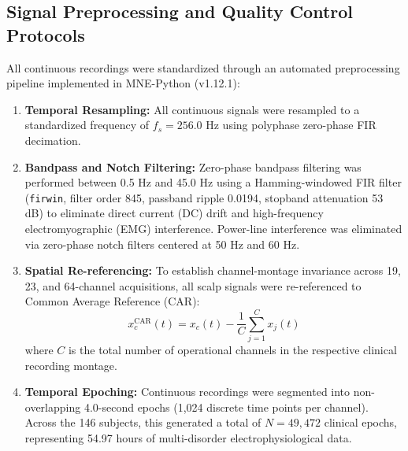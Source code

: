 \documentclass[11pt,a4paper]{article}
\begin{document}
\subsection{Signal Preprocessing and Quality Control Protocols}
All continuous recordings were standardized through an automated preprocessing pipeline implemented in MNE-Python (v1.12.1):
\begin{enumerate}
    \item \textbf{Temporal Resampling:} All continuous signals were resampled to a standardized frequency of $f_s = 256.0\text{ Hz}$ using polyphase zero-phase FIR decimation.
    \item \textbf{Bandpass and Notch Filtering:} Zero-phase bandpass filtering was performed between 0.5 Hz and 45.0 Hz using a Hamming-windowed FIR filter (\texttt{firwin}, filter order 845, passband ripple 0.0194, stopband attenuation 53 dB) to eliminate direct current (DC) drift and high-frequency electromyographic (EMG) interference. Power-line interference was eliminated via zero-phase notch filters centered at 50 Hz and 60 Hz.
    \item \textbf{Spatial Re-referencing:} To establish channel-montage invariance across 19, 23, and 64-channel acquisitions, all scalp signals were re-referenced to Common Average Reference (CAR):
    \begin{equation}
        x_c^{\text{CAR}}(t) = x_c(t) - \frac{1}{C} \sum_{j=1}^C x_j(t)
    \end{equation}
    where $C$ is the total number of operational channels in the respective clinical recording montage.
    \item \textbf{Temporal Epoching:} Continuous recordings were segmented into non-overlapping 4.0-second epochs (1,024 discrete time points per channel). Across the 146 subjects, this generated a total of $N = 49,472$ clinical epochs, representing 54.97 hours of multi-disorder electrophysiological data.
\end{enumerate}
\end{document}
